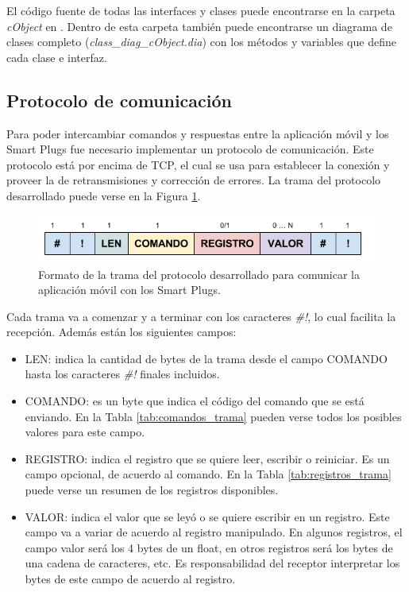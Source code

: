 El código fuente de todas las interfaces y clases puede encontrarse en la carpeta \textit{cObject} en \citep{repo_firmware}. Dentro de esta carpeta también puede encontrarse un diagrama de clases completo (\textit{class\_diag\_cObject.dia}) con los métodos y variables que define cada clase e interfaz.


\subsection{Protocolo de comunicación}
\label{subsection:protocolo}

Para poder intercambiar comandos y respuestas entre la aplicación móvil y los Smart Plugs fue necesario implementar un protocolo de comunicación. Este protocolo está por encima de TCP, el cual se usa para establecer la conexión y proveer la de retransmisiones y corrección de errores. La trama del protocolo desarrollado puede verse en la Figura \ref{fig:formato_trama}. 

\begin{figure}[h]
	\centering
	\includegraphics[width=13cm]{./Figures/3_2_4_formato_trama.png}
	\caption{Formato de la trama del protocolo desarrollado para comunicar la aplicación móvil con los Smart Plugs.}
	\label{fig:formato_trama}
\end{figure}

Cada trama va a comenzar y a terminar con los caracteres \textit{\#!}, lo cual facilita la recepción. Además están los siguientes campos:

\begin{itemize}
\item LEN: indica la cantidad de bytes de la trama desde el campo COMANDO hasta los caracteres \textit{\#!} finales incluidos.
\item COMANDO: es un byte que indica el código del comando que se está enviando. En la Tabla \ref{tab:comandos_trama} pueden verse todos los posibles valores para este campo.
\item REGISTRO: indica el registro que se quiere leer, escribir o reiniciar. Es un campo opcional, de acuerdo al comando. En la Tabla \ref{tab:registros_trama} puede verse un resumen de los registros disponibles.
\item VALOR: indica el valor que se leyó o se quiere escribir en un registro. Este campo va a variar de acuerdo al registro manipulado. En algunos registros, el campo valor será los 4 bytes de un float, en otros registros será los bytes de una cadena de caracteres, etc. Es responsabilidad del receptor interpretar los bytes de este campo de acuerdo al registro.
\end{itemize}



